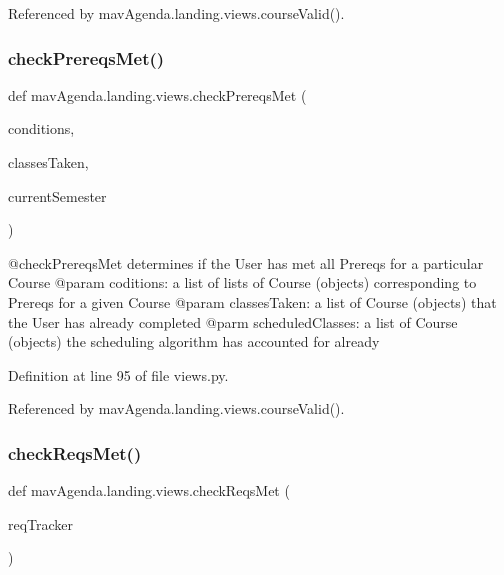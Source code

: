 Referenced by mav\+Agenda.\+landing.\+views.\+course\+Valid().

\mbox{\label{namespacemavAgenda_1_1landing_1_1views_ab39ff28312a049e51783d4b5c09c2889}} 
\subsubsection{\texorpdfstring{check\+Prereqs\+Met()}{checkPrereqsMet()}}
{\footnotesize\ttfamily def mav\+Agenda.\+landing.\+views.\+check\+Prereqs\+Met (\begin{DoxyParamCaption}\item[{}]{conditions,  }\item[{}]{classes\+Taken,  }\item[{}]{current\+Semester }\end{DoxyParamCaption})}

\begin{DoxyVerb}@checkPrereqsMet determines if the User has met all Prereqs for a particular Course
@param coditions: a list of lists of Course (objects) corresponding to Prereqs for a given Course
@param classesTaken: a list of Course (objects) that the User has already completed
@parm scheduledClasses: a list of Course (objects) the scheduling algorithm has accounted for already
\end{DoxyVerb}
 

Definition at line 95 of file views.\+py.



Referenced by mav\+Agenda.\+landing.\+views.\+course\+Valid().

\mbox{\label{namespacemavAgenda_1_1landing_1_1views_afdf8c77f4b035382e2b1b73912edf180}} 
\subsubsection{\texorpdfstring{check\+Reqs\+Met()}{checkReqsMet()}}
{\footnotesize\ttfamily def mav\+Agenda.\+landing.\+views.\+check\+Reqs\+Met (\begin{DoxyParamCaption}\item[{}]{req\+Tracker }\end{DoxyParamCaption})}

